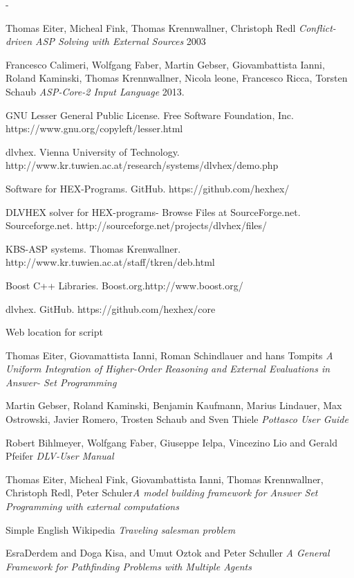 \documentclass[14pt,a4paper, titlepage]{article}
\begin{document}
-\begin{thebibliography}{1}
 Thomas Eiter, Micheal Fink, Thomas 
Krennwallner, Christoph Redl {\em Conflict-driven ASP 
Solving with External Sources} 2003   
  
 Francesco Calimeri, Wolfgang Faber, Martin 
Gebser, Giovambattista Ianni, Roland Kaminski, Thomas 
Krennwallner, Nicola leone, Francesco Ricca, Torsten Schaub 
{\em ASP-Core-2 Input Language} 2013.

 GNU Lesser General Public License. Free 
Software Foundation, Inc. 
https://www.gnu.org/copyleft/lesser.html 

dlvhex. Vienna University of 
Technology. 
http://www.kr.tuwien.ac.at/research/systems/dlvhex/demo.php 

Software for HEX-Programs. GitHub. 
https://github.com/hexhex/ 

DLVHEX solver for HEX-programs-  
Browse Files at SourceForge.net. Sourceforge.net. 
http://sourceforge.net/projects/dlvhex/files/

KBS-ASP systems. Thomas Krenwallner. 
http://www.kr.tuwien.ac.at/staff/tkren/deb.html

Boost C++ Libraries. 
Boost.org.http://www.boost.org/

% 
%
 
dlvhex. GitHub. 
https://github.com/hexhex/core

Web location for script

Thomas Eiter, Giovamattista Ianni, Roman 
Schindlauer and hans Tompits {\em A Uniform Integration of 
Higher-Order Reasoning and External Evaluations in Answer-
Set Programming} 


Martin Gebser, Roland Kaminski, Benjamin 
Kaufmann, Marius Lindauer, Max Ostrowski, Javier Romero, 
Trosten Schaub and Sven Thiele {\em Pottasco User Guide}

Robert Bihlmeyer, Wolfgang Faber, Giuseppe 
Ielpa, Vincezino Lio and Gerald Pfeifer {\em DLV-User 
Manual} 

Thomas Eiter, Micheal Fink, Giovambattista 
Ianni, Thomas Krennwallner, Christoph Redl, Peter 
Schuler{\em A model building framework for Answer Set 
Programming with external computations} 

 Simple English Wikipedia {\em Traveling 
salesman problem}

 EsraDerdem and Doga Kisa, and Umut 
Oztok and Peter Schuller {\em A General Framework for  
Pathfinding Problems with Multiple Agents}
\end{thebibliography} 
\end{document}
